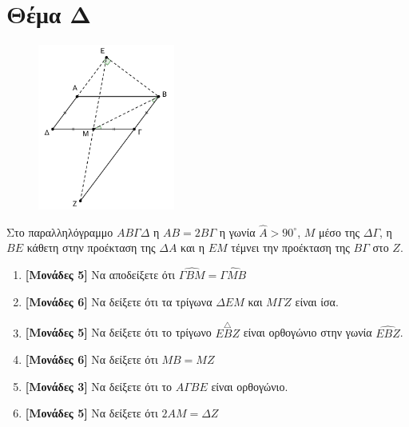 \documentclass[12pt]{article}
\begin{document}
\section*{Θέμα Δ}
  \noindent
  \begin{figure}
    \centering
    \vspace{-50pt}
    \includegraphics[width=0.4\textwidth]{2017AGeo4}
  \end{figure}
  Στο παραλληλόγραμμο $ΑΒΓΔ$ η $ΑΒ=2ΒΓ$ η γωνία $\hat{Α}>90^{\circ}$, $Μ$ μέσο της $ΔΓ$, η $ΒΕ$ κάθετη στην προέκταση της $ΔΑ$ και η $ΕΜ$ τέμνει την προέκταση της $ΒΓ$ στο $Ζ$.
  \begin{enumerate}
    \item \textbf{[Μονάδες 5]}  Να αποδείξετε ότι $\widehat{ΓΒΜ}=\widehat{ΓΜΒ}$
    \item \textbf{[Μονάδες 6]}  Να δείξετε ότι τα τρίγωνα $ΔΕΜ$ και $ΜΓΖ$ είναι ίσα.
    \item \textbf{[Μονάδες 5]}  Να δείξετε ότι το τρίγωνο $\overset{\triangle}{ΕΒΖ}$ είναι ορθογώνιο στην γωνία $\widehat{ΕΒΖ}$.
    \item \textbf{[Μονάδες 6]}  Να δείξετε ότι $ΜΒ=ΜΖ$
    \item \textbf{[Μονάδες 3]}  Να δείξετε ότι το $ΑΓΒΕ$ είναι ορθογώνιο.
    \item \textbf{[Μονάδες 5]}  Να δείξετε ότι $2ΑΜ=ΔΖ$
  \end{enumerate}

\vspace{3\baselineskip}
\end{document}
